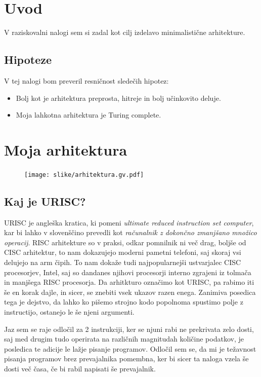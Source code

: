 \documentclass[12pt]{article}
\begin{document}
\section{Uvod}
V raziskovalni nalogi sem si zadal kot cilj izdelavo minimalistične arhitekture.

\subsection{Hipoteze}
V tej nalogi bom preveril resničnost sledečih hipotez:
\begin{itemize}
  \item Bolj kot je arhitektura preprosta, hitreje in bolj učinkovito deluje.
  \item Moja lahkotna arhitektura je Turing complete.
\end{itemize}

\section{Moja arhitektura}
\begin{figure}[h]
  \centering
  \texttt{[image: slike/arhitektura.gv.pdf]}
  \end{figure}

\subsection{Kaj je URISC?}
URISC je angleška kratica, ki pomeni \textit{ultimate reduced instruction set computer}, kar bi lahko v slovenščino prevedli kot \textit{računalnik z dokončno zmanjšano množico operacij}.
RISC arhitekture so v praksi, odkar pomnilnik ni več drag, boljše od CISC arhitektur, to nam dokazujejo moderni pametni telefoni, saj skoraj vsi delujejo na arm čipih.
To nam dokaže tudi najpopularnejši ustvarjalec CISC procesorjev, Intel, saj so dandanes njihovi procesorji interno zgrajeni iz tolmača in manjšega RISC procesorja.
Da arhitkturo označimo kot URISC, pa rabimo iti še en korak dajle, in sicer, se znebiti vsek ukazov razen enega.
Zanimiva posedica tega je dejstvo, da lahko ko pišemo strojno kodo popolnoma spustimo polje z instructijo, ostanejo le še njeni argumenti.

Jaz sem se raje odločil za 2 instrukciji, ker se njuni rabi ne prekrivata zelo dosti, saj med drugim tudo operirata na različnih magnitudah količine podatkov, je posledica te adicije le lažje pisanje programov.
Odločil sem se, da mi je težavnost pisanja programov brez prevajalnika pomembna, ker bi sicer ta naloga vzela še dosti več časa, če bi rabil napisati še prevajalnik.
\end{document}
